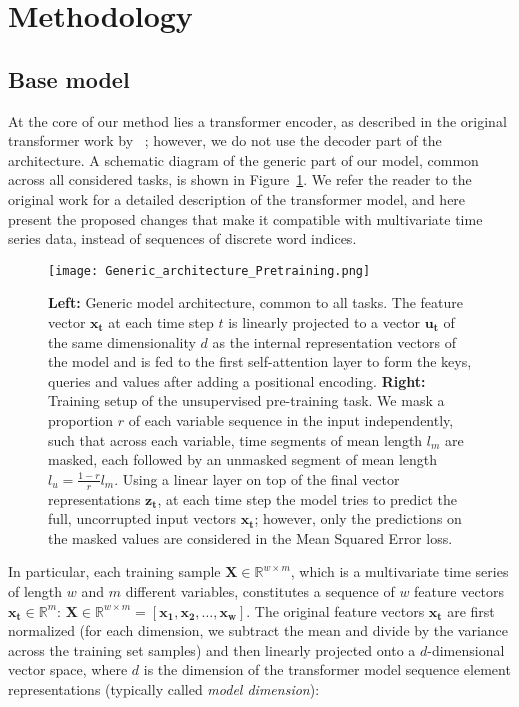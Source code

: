 \documentclass{article} \usepackage{iclr2021_conference,times}
\begin{document}
\section{Methodology}

\subsection{Base model}\label{sec:base_model}

At the core of our method lies a transformer encoder, as described in the original transformer work by ~\citet{vaswani_attention_2017}; however, we do not use the decoder part of the architecture.  A schematic diagram of the generic part of our model, common across all considered tasks, is shown in Figure~\ref{fig:generic_architecture_pretraining}. We refer the reader to the original work for a detailed description of the transformer model, and here present the proposed changes that make it compatible with multivariate time series data, instead of sequences of discrete word indices.

\begin{figure}[h]
    \centering
    \texttt{[image: Generic\_architecture\_Pretraining.png]}
    \caption{\textbf{Left:} Generic model architecture, common to all tasks. The feature vector $\mathbf{x_t}$ at each time step $t$ is linearly projected to a vector $\mathbf{u_t}$ of the same dimensionality $d$ as the internal representation vectors of the model and is fed to the first self-attention layer to form the keys, queries and values after adding a positional encoding. \textbf{Right:} Training setup of the unsupervised pre-training task. We mask a proportion $r$ of each variable sequence in the input independently, such that across each variable, time segments of mean length $l_m$ are masked, each followed by an unmasked segment of mean length $l_u = \frac{1-r}{r}l_m$. Using a linear layer on top of the final vector representations $\mathbf{z_t}$, at each time step the model tries to predict the full, uncorrupted input vectors $\mathbf{x_t}$; however, only the predictions on the masked values are considered in the Mean Squared Error loss.}
    \label{fig:generic_architecture_pretraining}
\end{figure}

In particular, each training sample $\mathbf{X} \in \mathbb{R}^{w\times m}$, which is a multivariate time series of length $w$ and $m$ different variables, constitutes a sequence of $w$ feature vectors $\mathbf{x_t}  \in \mathbb{R}^{m}$:  $\mathbf{X} \in \mathbb{R}^{w\times m} = [\mathbf{x_1}, \mathbf{x_2}, \dots, \mathbf{x_w}]$. The original feature vectors $\mathbf{x_t}$ are first normalized (for each dimension, we subtract the mean and divide by the variance across the training set samples) and then linearly projected onto a $d$-dimensional vector space, where $d$ is the dimension of the transformer model sequence element representations (typically called \textit{model dimension}):
\end{document}
